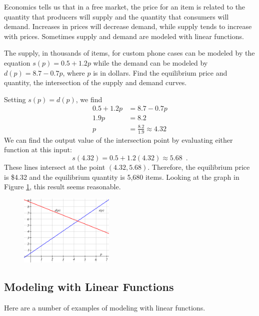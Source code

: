 Economics tells us that in a free market, the price for an item is related to the quantity that producers will supply and the quantity that consumers will demand. Increases in prices will decrease demand, while supply tends to increase with prices. Sometimes supply and demand are modeled with linear functions.
\begin{example}
  The supply, in thousands of items, for custom phone cases can be modeled by the equation $s(p)=0.5+1.2p$ while the demand can be modeled by $d(p)=8.7-0.7p$, where $p$ is in dollars. Find the equilibrium price and quantity, the intersection of the supply and demand curves.

  \begin{solution} Setting $s(p)=d(p)$, we find
  \begin{align*}
    0.5 + 1.2p &= 8.7-0.7p \\
    1.9p &= 8.2 \\
    p&=\frac{8.2}{1.9} \approx 4.32
  \end{align*}
  We can find the output value of the intersection point by evaluating either function at this input:
  $$ s(4.32) = 0.5+1.2(4.32) \approx 5.68 \enspace .$$
  These lines intersect at the point $(4.32, 5.68)$. Therefore, the equilibrium price is \$4.32 and the equilibrium quantity is 5,680 items. Looking at the graph in Figure \ref{fig:intersection}, this result seems reasonable.
  \begin{figure}[!ht]
  \centering
  \includegraphics[width=0.4\textwidth]{img/chap1/sec1-4/image053.png}
  \caption{}
  \label{fig:intersection}
  \end{figure}
\end{solution}\end{example}

\subsection{Modeling with Linear Functions}
\label{ssec:modeling-linear}

Here are a number of examples of modeling with linear functions.

